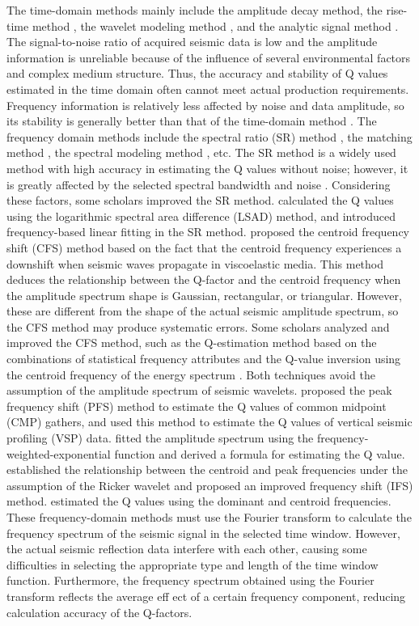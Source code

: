 The time-domain methods mainly include the amplitude decay method, the
rise-time method \cite[]{Kjartansson79}, the wavelet modeling method
\cite[]{Jannsen85}, and the analytic signal method
\cite[]{Engelhard96}. The signal-to-noise ratio of acquired seismic
data is low and the amplitude information is unreliable because of the
influence of several environmental factors and complex medium
structure. Thus, the accuracy and stability of Q values estimated in
the time domain often cannot meet actual production
requirements. Frequency information is relatively less affected by
noise and data amplitude, so its stability is generally better than
that of the time-domain method \cite[]{Gong09, Yan01}. The frequency
domain methods include the spectral ratio (SR) method \cite[]{Bath74},
the matching method \cite[]{Raikes84}, the spectral modeling method
\cite[]{Jannsen85}, etc. The SR method is a widely used method with
high accuracy in estimating the Q values without noise; however, it is
greatly affected by the selected spectral bandwidth and noise
\cite[]{Tonn91}. Considering these factors, some scholars improved the
SR method. \cite{Wang15a} calculated the Q values using the
logarithmic spectral area difference (LSAD) method, and \cite{Liu18}
introduced frequency-based linear fitting in the SR
method. \cite{Quan97} proposed the centroid frequency shift (CFS)
method based on the fact that the centroid frequency experiences a
downshift when seismic waves propagate in viscoelastic media. This
method deduces the relationship between the Q-factor and the centroid
frequency when the amplitude spectrum shape is Gaussian, rectangular,
or triangular. However, these are different from the shape of the
actual seismic amplitude spectrum, so the CFS method may produce
systematic errors. Some scholars analyzed and improved the CFS method,
such as the Q-estimation method based on the combinations of
statistical frequency attributes \cite[]{Zhao13} and the Q-value
inversion using the centroid frequency of the energy spectrum
\cite[]{Wang15b}. Both techniques avoid the assumption of the
amplitude spectrum of seismic wavelets. \cite{Zhang02} proposed the
peak frequency shift (PFS) method to estimate the Q values of common
midpoint (CMP) gathers, and \cite{Gao07} used this method to estimate
the Q values of vertical seismic profiling (VSP) data. \cite{Li15a}
fitted the amplitude spectrum using the frequency-weighted-exponential
function and derived a formula for estimating the Q value. \cite{Hu13}
established the relationship between the centroid and peak frequencies
under the assumption of the Ricker wavelet and proposed an improved
frequency shift (IFS) method.  \cite{Li15b} estimated the Q values
using the dominant and centroid frequencies. These frequency-domain
methods must use the Fourier transform to calculate the frequency
spectrum of the seismic signal in the selected time window. However,
the actual seismic reflection data interfere with each other, causing
some difficulties in selecting the appropriate type and length of the
time window function. Furthermore, the frequency spectrum obtained
using the Fourier transform reflects the average eff ect of a certain
frequency component, reducing calculation accuracy of the Q-factors.

